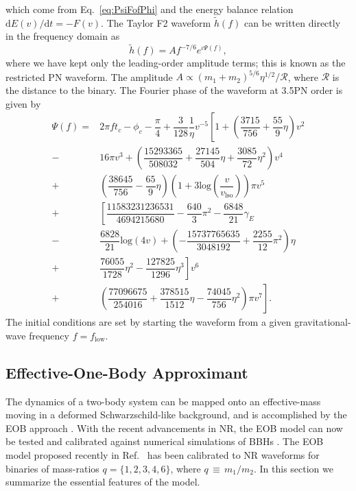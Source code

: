 \documentclass[aps,
prd,
amsmath,
amssymb,
twocolumn,
floatfix,
groupedaddress]{revtex4-1}
\newcommand{\D}{\mathrm{d}}
\def\l({\left(}
\def\r){\right)}
\begin{document}
which come from Eq.~\eqref{eq:PsiFofPhi} and the energy balance relation $\D E(v)/\D t = -F(v)$. The Taylor F2 waveform $\tilde{h}(f)$ can be written  directly in the frequency domain as
\begin{equation}
\tilde{h}(f) = Af^{-7/6}e^{\iota\Psi(f)},
\end{equation}
where we have kept only the leading-order amplitude terms; this is known as the restricted PN waveform. The amplitude $A\propto (m_1+m_2)^{5/6}\eta^{1/2}/\mathcal{R}$, where $\mathcal{R}$ is the distance to the binary. The Fourier phase of the waveform at 3.5PN order is given by \citep{Sathyaprakash:1991mt,Cutler:1994ys,GW2PN,Blanchet:2001ax,Blanchet:2004ek,Poisson:1995ef,Allen:2005fk}
\begin{equation}
\begin{split}\label{eq:PsiSPA}
\Psi(f)=&2\pi ft_c-\phi_c-\dfrac{\pi}{4} + \dfrac{3}{128}\dfrac{1}{\eta}v^{-5}\left[1 + \l(\dfrac{3715}{756} +\dfrac{55}{9}\eta\r)v^2\right.\\
-&\left. 16\pi v^3+\l(\dfrac{15293365}{508032}+\dfrac{27145}{504}\eta +\dfrac{3085}{72}\eta^2 \r)v^4\right.\\
+&\left.\l(\dfrac{38645}{756}-\dfrac{65}{9}\eta\r)\l(1+3\textrm{log}\l(\dfrac{v}{v_{\textrm{lso}}}\r)\r)\pi v^5\right.\\
+&\left.\left[\dfrac{11583231236531}{4694215680}-\dfrac{640}{3}\pi^2 -\dfrac{6848}{21}\gamma_E\right.\right.\\
-&\left.\left. \dfrac{6828}{21}\textrm{log}(4v)+\l(-\dfrac{15737765635}{3048192}+\dfrac{2255}{12}\pi^2 \r)\eta\right.\right.\\
+&\left.\left.\dfrac{76055}{1728}\eta^2 -\dfrac{127825}{1296}\eta^3\right] v^6\right.\\
+&\left.\l(\dfrac{77096675}{254016}+\dfrac{378515}{1512}\eta -\dfrac{74045}{756}\eta^2 \r)\pi v^7\right].
\end{split}
\end{equation}
The initial conditions are set by starting the waveform from a given gravitational-wave frequency $f=f_{\mathrm{low}}$.

\subsection{Effective-One-Body Approximant}\label{sec:level2:EOBNRv2}
The dynamics of a two-body system can be mapped onto an effective-mass moving in a deformed Schwarzschild-like background, and is accomplished by the EOB approach \citep{EOBOriginalBuonannoDamour}. With the recent advancements in NR, the EOB model can now be tested and calibrated against numerical simulations of BBHs \cite{EOBdevel01,EOBdevel02,EOBNRdevel03,DamourFluxhlm01,EOBNRdevel01}. The EOB model proposed recently in Ref.~\citep{BuonannoEOBv2Main} has been calibrated to NR waveforms for binaries of mass-ratios $q=\{1,2,3,4,6\}$, where $q\,\equiv \, m_1/m_2$. In this section we summarize the essential features of the model. 
\end{document}

